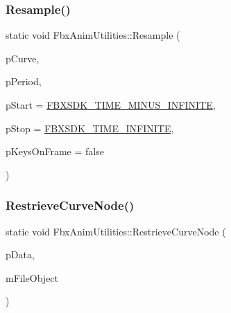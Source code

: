 \mbox{\label{class_fbx_anim_utilities_a3fde586a335a5296a9c5a215993b8a52}} 
\subsubsection{\texorpdfstring{Resample()}{Resample()}\hspace{0.1cm}{\footnotesize\ttfamily [3/3]}}
{\footnotesize\ttfamily static void Fbx\+Anim\+Utilities\+::\+Resample (\begin{DoxyParamCaption}\item[{\hyperlink{class_fbx_anim_curve}{Fbx\+Anim\+Curve} \&}]{p\+Curve,  }\item[{\hyperlink{class_fbx_time}{Fbx\+Time}}]{p\+Period,  }\item[{\hyperlink{class_fbx_time}{Fbx\+Time}}]{p\+Start = {\ttfamily \hyperlink{fbxtime_8h_ad274ec1f909723127ab573a52f8be216}{F\+B\+X\+S\+D\+K\+\_\+\+T\+I\+M\+E\+\_\+\+M\+I\+N\+U\+S\+\_\+\+I\+N\+F\+I\+N\+I\+TE}},  }\item[{\hyperlink{class_fbx_time}{Fbx\+Time}}]{p\+Stop = {\ttfamily \hyperlink{fbxtime_8h_a1e6db3fe0f84f0b7daa775739f93526f}{F\+B\+X\+S\+D\+K\+\_\+\+T\+I\+M\+E\+\_\+\+I\+N\+F\+I\+N\+I\+TE}},  }\item[{bool}]{p\+Keys\+On\+Frame = {\ttfamily false} }\end{DoxyParamCaption})\hspace{0.3cm}{\ttfamily [static]}}

\mbox{\label{class_fbx_anim_utilities_a8edba181bc102d45bf3a66ddc987cbac}} 
\subsubsection{\texorpdfstring{Restrieve\+Curve\+Node()}{RestrieveCurveNode()}}
{\footnotesize\ttfamily static void Fbx\+Anim\+Utilities\+::\+Restrieve\+Curve\+Node (\begin{DoxyParamCaption}\item[{\hyperlink{class_fbx_anim_utilities_1_1_curve_node_intfce}{Curve\+Node\+Intfce} \&}]{p\+Data,  }\item[{\hyperlink{class_fbx_i_o}{Fbx\+IO} $\ast$}]{m\+File\+Object }\end{DoxyParamCaption})\hspace{0.3cm}{\ttfamily [static]}}

